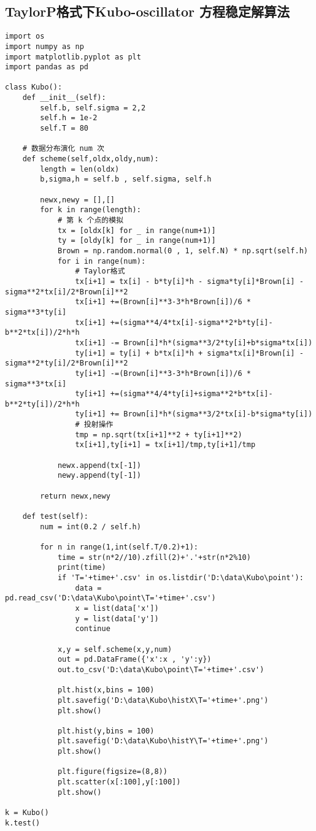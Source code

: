 \subsection*{TaylorP格式下Kubo-oscillator 方程稳定解算法}
\scriptsize{
\begin{lstlisting}[style=styleP]
import os 
import numpy as np
import matplotlib.pyplot as plt
import pandas as pd

class Kubo():
	def __init__(self):
		self.b, self.sigma = 2,2
		self.h = 1e-2
		self.T = 80
	
	# 数据分布演化 num 次 
	def scheme(self,oldx,oldy,num):
		length = len(oldx)
		b,sigma,h = self.b , self.sigma, self.h
	
		newx,newy = [],[]
		for k in range(length):
			# 第 k 个点的模拟
			tx = [oldx[k] for _ in range(num+1)]
			ty = [oldy[k] for _ in range(num+1)]
			Brown = np.random.normal(0 , 1, self.N) * np.sqrt(self.h)
			for i in range(num):
				# Taylor格式
				tx[i+1] = tx[i] - b*ty[i]*h - sigma*ty[i]*Brown[i] - sigma**2*tx[i]/2*Brown[i]**2
				tx[i+1] +=(Brown[i]**3-3*h*Brown[i])/6 * sigma**3*ty[i]
				tx[i+1] +=(sigma**4/4*tx[i]-sigma**2*b*ty[i]-b**2*tx[i])/2*h*h
				tx[i+1] -= Brown[i]*h*(sigma**3/2*ty[i]+b*sigma*tx[i])
				ty[i+1] = ty[i] + b*tx[i]*h + sigma*tx[i]*Brown[i] - sigma**2*ty[i]/2*Brown[i]**2
				ty[i+1] -=(Brown[i]**3-3*h*Brown[i])/6 * sigma**3*tx[i]
				ty[i+1] +=(sigma**4/4*ty[i]+sigma**2*b*tx[i]-b**2*ty[i])/2*h*h
				ty[i+1] += Brown[i]*h*(sigma**3/2*tx[i]-b*sigma*ty[i])
				# 投射操作
				tmp = np.sqrt(tx[i+1]**2 + ty[i+1]**2)
				tx[i+1],ty[i+1] = tx[i+1]/tmp,ty[i+1]/tmp

			newx.append(tx[-1])
			newy.append(ty[-1])
		
		return newx,newy
	
	def test(self):
		num = int(0.2 / self.h)
		
		for n in range(1,int(self.T/0.2)+1):
			time = str(n*2//10).zfill(2)+'.'+str(n*2%10)
			print(time)
			if 'T='+time+'.csv' in os.listdir('D:\data\Kubo\point'):
				data = pd.read_csv('D:\data\Kubo\point\T='+time+'.csv')
				x = list(data['x'])
				y = list(data['y'])
				continue
		
			x,y = self.scheme(x,y,num)
			out = pd.DataFrame({'x':x , 'y':y})
			out.to_csv('D:\data\Kubo\point\T='+time+'.csv')
			
			plt.hist(x,bins = 100)
			plt.savefig('D:\data\Kubo\histX\T='+time+'.png')
			plt.show()
			
			plt.hist(y,bins = 100)
			plt.savefig('D:\data\Kubo\histY\T='+time+'.png')
			plt.show()
			
			plt.figure(figsize=(8,8))
			plt.scatter(x[:100],y[:100])
			plt.show()

k = Kubo()
k.test()
\end{lstlisting}
}







